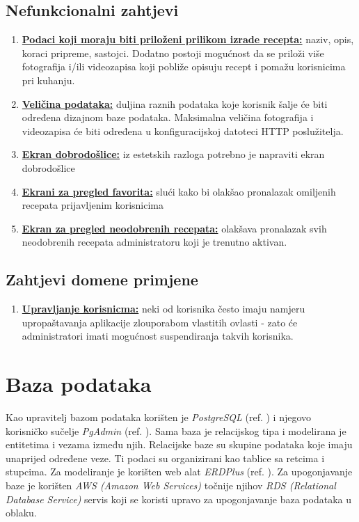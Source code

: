 \documentclass[times, utf8, zavrsni]{fer}
\begin{document}
\section{Nefunkcionalni zahtjevi}
\begin{enumerate}
      \item \textbf{\underline{Podaci koji moraju biti priloženi prilikom izrade recepta:}} naziv, opis, koraci pripreme,
            sastojci. Dodatno postoji mogućnost da se priloži više fotografija
            i/ili videozapisa koji pobliže opisuju recept i pomažu korisnicima pri kuhanju.
      \item \textbf{\underline{Veličina podataka:}} duljina raznih podataka koje korisnik šalje će biti
            određena dizajnom baze podataka. Maksimalna veličina fotografija i videozapisa će biti određena
            u konfiguracijskoj datoteci HTTP poslužitelja.
      \item \textbf{\underline{Ekran dobrodošlice:}} iz estetskih razloga potrebno je napraviti
            ekran dobrodošlice
      \item \textbf{\underline{Ekrani za pregled favorita:}} slući kako bi olakšao pronalazak omiljenih recepata prijavljenim korisnicima
      \item \textbf{\underline{Ekran za pregled neodobrenih recepata:}} olakšava pronalazak svih neodobrenih recepata administratoru koji je trenutno aktivan.
\end{enumerate}

\section{Zahtjevi domene primjene}
\begin{enumerate}
      \item \textbf{\underline{Upravljanje korisnicma:}} neki od korisnika često imaju namjeru
            upropaštavanja aplikacije zlouporabom vlastitih ovlasti - zato će administratori imati
            mogućnost suspendiranja takvih korisnika.

\end{enumerate}
\chapter{Baza podataka}
Kao upravitelj bazom podataka korišten je \textit{PostgreSQL} (ref. \cite{PostgreSQL})  i njegovo korisničko sučelje \textit{PgAdmin} (ref. \cite{PgAdmin}).
Sama baza je relacijskog tipa i modelirana je entitetima i vezama između njih.
Relacijske baze su skupine podataka koje imaju unaprijed određene veze. Ti podaci su organizirani kao tablice sa retcima
i stupcima.
Za modeliranje je korišten web alat \textit{ERDPlus} (ref. \cite{ERDPlus}). Za upogonjavanje baze je korišten \textit{AWS (Amazon Web Services)}
točnije njihov \textit{RDS (Relational Database Service)} servis koji se koristi upravo za upogonjavanje baza podataka u oblaku.
\end{document}
